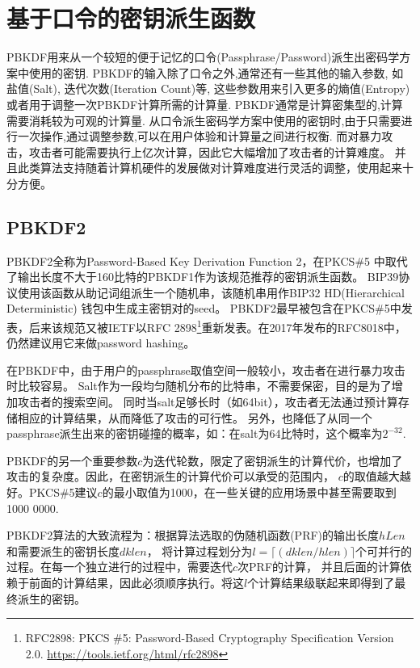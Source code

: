 
\section{基于口令的密钥派生函数}

PBKDF用来从一个较短的便于记忆的口令(Passphrase/Password)派生出密码学方案中使用的密钥.
PBKDF的输入除了口令之外,通常还有一些其他的输入参数, 如盐值(Salt), 迭代次数(Iteration Count)等,
这些参数用来引入更多的熵值(Entropy)或者用于调整一次PBKDF计算所需的计算量.
PBKDF通常是计算密集型的,计算需要消耗较为可观的计算量.
从口令派生密码学方案中使用的密钥时,由于只需要进行一次操作,通过调整参数,可以在用户体验和计算量之间进行权衡.
而对暴力攻击，攻击者可能需要执行上亿次计算，因此它大幅增加了攻击者的计算难度。
并且此类算法支持随着计算机硬件的发展做对计算难度进行灵活的调整，使用起来十分方便。

\subsection{PBKDF2}
PBKDF2全称为Password-Based Key Derivation Function 2，在PKCS\#5
中取代了输出长度不大于160比特的PBKDF1作为该规范推荐的密钥派生函数。
BIP39协议使用该函数从助记词组派生一个随机串，该随机串用作BIP32 HD(Hierarchical Deterministic)
钱包中生成主密钥对的seed。  PBKDF2最早被包含在PKCS\#5中发表，后来该规范又被IETF以RFC 
2898\footnote{
RFC2898: PKCS \#5: Password-Based Cryptography Specification Version 2.0.
\url{https://tools.ietf.org/html/rfc2898}}重新发表。在2017年发布的RFC8018中，仍然建议用它来做password hashing。

在PBKDF中，由于用户的passphrase取值空间一般较小，攻击者在进行暴力攻击时比较容易。
Salt作为一段均匀随机分布的比特串，不需要保密，目的是为了增加攻击者的搜索空间。
同时当salt足够长时（如64bit），攻击者无法通过预计算存储相应的计算结果，从而降低了攻击的可行性。
另外，也降低了从同一个passphrase派生出来的密钥碰撞的概率，如：在salt为64比特时，这个概率为$2^{-32}$.

PBKDF的另一个重要参数$c$为迭代轮数，限定了密钥派生的计算代价，也增加了攻击的复杂度。因此，在密钥派生的计算代价可以承受的范围内，
$c$的取值越大越好。PKCS\#5建议$c$的最小取值为1000，在一些关键的应用场景中甚至需要取到1000 0000.

PBKDF2算法的大致流程为：根据算法选取的伪随机函数(PRF)的输出长度$hLen$和需要派生的密钥长度$dklen$，
将计算过程划分为$l=\lceil (dklen/hlen) \rceil$个可并行的过程。在每一个独立进行的过程中，需要迭代$c$次PRF的计算，
并且后面的计算依赖于前面的计算结果，因此必须顺序执行。将这$l$个计算结果级联起来即得到了最终派生的密钥。

